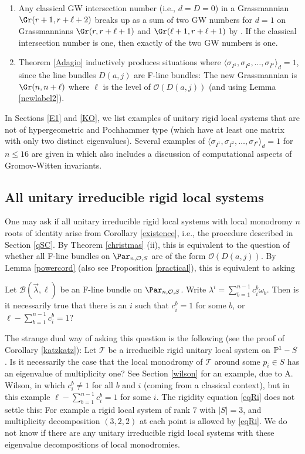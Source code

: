 \begin{enumerate}
\item Any classical GW intersection number (i.e., $d=D=0$) in a Grassmannian $\Gr(r+1,r+\ell+2)$ breaks up as a sum of two GW numbers for $d=1$ on Grassmannians $\Gr(r,r+\ell+1)$ and $\Gr(\ell+1,r+\ell+1)$ by \cite[Section 9.9]{BGM}. If the classical intersection number is one, then exactly of the two GW numbers is one.
\item Theorem \ref{Adagio} inductively produces situations where $\langle\sigma_{I^1}, \sigma_{I^2},\dots,\sigma_{I^s}\rangle_d= 1$, since the line bundles $D(a,j)$ are F-line bundles: The new Grassmannian
is $\Gr(n,n+\ell)$ where $\ell$ is the level of $\mathcal{O}(D(a,j))$ (and using Lemma \ref{newlabel2}).
\end{enumerate}
In Sections \ref{E1} and \ref{KO}, we list examples of unitary rigid local systems that are not of hypergeometric and Pochhammer type (which have at least one  matrix with only two distinct eigenvalues). Several examples of $\langle\sigma_{I^1}, \sigma_{I^2},\dots,\sigma_{I^s}\rangle_d= 1$ for $n\leq 16$ are given in \cite{OO} which also includes a discussion of computational aspects of Gromov-Witten invariants.
\subsection{All unitary irreducible rigid local systems}\label{qSC2}
  One may ask if all unitary irreducible rigid local systems with local monodromy $n$ roots of identity arise from Corollary \ref{existence}, i.e., the procedure described in Section \ref{qSC}. By Theorem \ref{christmas} (ii), this is equivalent to the question  of whether all F-line bundles on $\Par_{n,\mathcal{O},S}$ are of the form $\mathcal{O}(D(a,j))$. By Lemma \ref{powercord} (also see Proposition  \ref{practical}), this is equivalent to asking
\begin{question}
\notready\label{Q}
Let $\mathcal{B}(\vec{\lambda},\ell)$ be an F-line bundle on $\Par_{n,\mathcal{O},S}$. Write $\lambda^i=\sum_{b=1}^{n -1} c^b_i\omega_b$. Then is it necessarily true that  there is an $i$ such that
$c^b_i=1$ for some $b$, or $\ell -\sum_{b=1}^{n-1} c^b_i=1$?
\end{question}
The strange dual way of asking this question is the following (see the proof of Corollary \ref{katzkatz}): Let $\mathcal{T}$ be a irreducible rigid unitary local system on $\Bbb{P}^1-S$. Is it necessarily the case that the local monodromy of $\mathcal{T}$ around some $p_i\in S$ has an eigenvalue of multiplicity one? See Section \ref{wilson} for an example, due to A. Wilson, in which
$c^b_i\neq 1$ for all $b$ and $i$ (coming from a classical context), but in this example  $\ell -\sum_{b=1}^{n-1} c^b_i=1$ for some $i$. The rigidity equation \eqref{eqRi} does not settle this:
For example a rigid local system of rank $7$ with $|S|=3$, and multiplicity decomposition $(3,2,2)$
at each point is allowed by \eqref{eqRi}. We do not know if there are any unitary irreducible rigid local systems with these eigenvalue decompositions of local monodromies.

